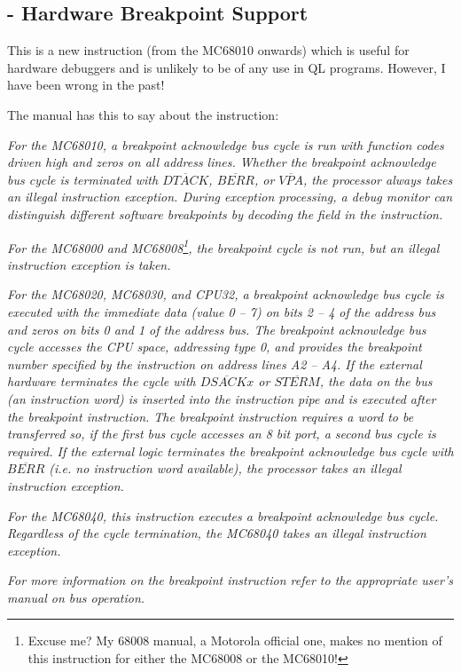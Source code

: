 \subsection{ - Hardware Breakpoint Support}

This is a new instruction (from the MC68010 onwards) which is useful for hardware debuggers and is unlikely to be of any use in QL programs. However, I have been wrong in the past!

The manual has this to say about the instruction:

\emph{For the MC68010, a breakpoint acknowledge bus cycle is run with function codes driven high and zeros on all address lines. Whether the breakpoint acknowledge bus cycle is terminated with $\overline{DTACK}$, $\overline{BERR}$, or $\overline{VPA}$, the processor always takes an illegal instruction exception. During exception processing, a debug monitor can distinguish different software breakpoints by decoding the field in the  instruction.}

\emph{For the MC68000 and MC68008\footnote{Excuse me? My 68008 manual, a Motorola official one, makes no mention of this instruction for either the MC68008 or the MC68010!}, the breakpoint cycle is not run, but an illegal instruction exception is taken.}

\emph{For the MC68020, MC68030, and CPU32, a breakpoint acknowledge bus cycle is executed with the immediate data (value 0 – 7) on bits 2 – 4 of the address bus and zeros on bits 0 and 1 of the address bus. The breakpoint acknowledge bus cycle accesses the CPU space, addressing type 0, and provides the breakpoint number specified by the instruction on address lines A2 – A4. If the external hardware terminates the cycle
with $\overline{DSACKx}$ or $\overline{STERM}$, the data on the bus (an instruction word) is inserted into the instruction pipe and is executed after the breakpoint instruction. The breakpoint instruction requires a word to be transferred so, if the first bus cycle accesses an 8 bit port,
a second bus cycle is required. If the external logic terminates the breakpoint acknowledge bus cycle with $\overline{BERR}$ (i.e. no instruction word available), the processor takes an illegal instruction exception.}

\emph{For the MC68040, this instruction executes a breakpoint acknowledge bus cycle. Regardless of the cycle termination, the MC68040 takes an illegal instruction exception.}

\emph{For more information on the breakpoint instruction refer to the appropriate user’s manual on bus operation.}

